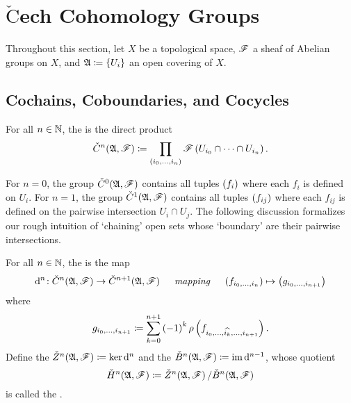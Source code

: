 \documentclass[../Moduli_Spaces_of_Riemann_Surfaces.tex]{subfiles}
\begin{document}
    \section{$\check{\textrm{C}}$ech Cohomology Groups}
    Throughout this section, let $X$ be a topological space, $\mathscr{F}$ a sheaf of Abelian groups on $X$, and $\mathfrak{A}\coloneqq\left\{U_i\right\}$ an open covering of $X$.
    \subsection{Cochains, Coboundaries, and Cocycles}
    \begin{definition}
        For all $n\in\mathbb{N}$, the  is the direct product
        \begin{equation*}
            \check{C}^n\!\left(\mathfrak{A},\mathscr{F}\right)\coloneqq\prod_{\left(i_0,\dots,i_n\right)}\mathscr{F}\left(U_{i_0}\cap\cdots\cap U_{i_n}\right).
        \end{equation*}
    \end{definition}
    \begin{remark}
        For $n=0$, the group $\check{C}^0\!\left(\mathfrak{A},\mathscr{F}\right)$ contains all tuples $\left(f_i\right)$ where each $f_i$ is defined on $U_i$. For $n=1$, the group $\check{C}^1\!\left(\mathfrak{A},\mathscr{F}\right)$ contains all tuples $\left(f_{ij}\right)$ where each $f_{ij}$ is defined on the pairwise intersection $U_i\cap U_j$. The following discussion formalizes our rough intuition of `chaining' open sets whose `boundary' are their pairwise intersections.\exqed
    \end{remark}
    \begin{definition}
        For all $n\in\mathbb{N}$, the  is the map
        \begin{equation*}
            \d^n\!:\check{C}^n\!\l(\mf{A},\ms{F}\r)\to\check{C}^{n+1}\!\l(\mf{A},\ms{F}\r)\ \ \ \ \textrm{\it{mapping}}\ \ \ \ \l(f_{i_0,\dots,i_n}\r)\mapsto\l(g_{i_0,\dots,i_{n+1}}\r)
        \end{equation*}
        where
        \vspace{-0.05in}
        \begin{equation*}
            g_{i_0,\dots,i_{n+1}}\coloneqq\sum_{k=0}^{n+1}\left(-1\right)^k\rho\left(f_{i_0,\dots,\widehat{i_k},\dots,i_{n+1}}\right).
        \end{equation*}
        Define the  $\check{Z}^n\!\left(\mathfrak{A},\mathscr{F}\right)\coloneqq\ker\mathrm{d}^n$ and the  $\check{B}^n\!\left(\mathfrak{A},\mathscr{F}\right)\coloneqq\operatorname{im}\mathrm{d}^{n-1}$, whose quotient
        \begin{equation*}
            \check{H}^n\!\l(\mf{A},\ms{F}\r)\coloneqq\check{Z}^n\!\l(\mf{A},\ms{F}\r)/\check{B}^n\!\l(\mf{A},\ms{F}\r)
            \vspace{-0.05in}
        \end{equation*}
        is called the .
    \end{definition}
\end{document}
